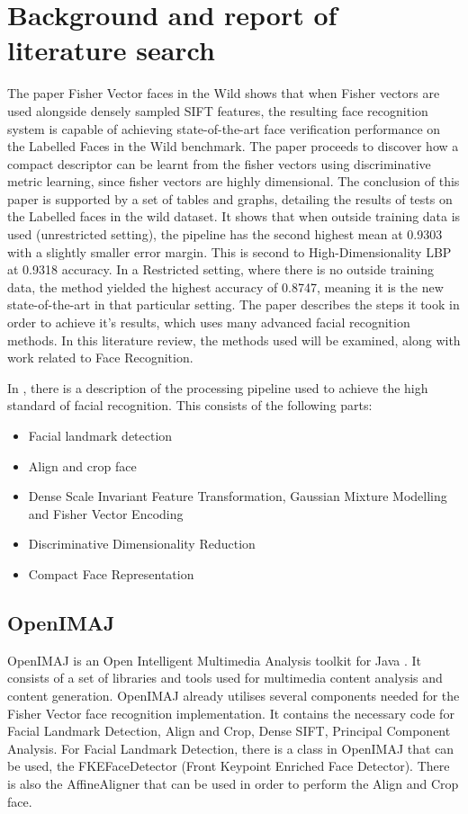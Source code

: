 \documentclass[12pt, a4paper]{article}
\begin{document}
\newpage
\section{Background and report of literature search}
The paper Fisher Vector faces in the Wild \cite{simonyan2004fisher} shows that when Fisher vectors are used alongside densely sampled SIFT features, the resulting face recognition system is capable of achieving state-of-the-art face verification performance on the Labelled Faces in the Wild \cite{labelledFaces} benchmark. The paper proceeds to discover how a compact descriptor can be learnt from the fisher vectors using discriminative metric learning, since fisher vectors are highly dimensional. The conclusion of this paper is supported by a set of tables and graphs, detailing the results of tests on the Labelled faces in the wild dataset. It shows that when outside training data is used (unrestricted setting), the pipeline has the second highest mean at 0.9303 with a slightly smaller error margin. This is second to High-Dimensionality LBP at 0.9318 accuracy. In a Restricted setting, where there is no outside training data, the method yielded the highest accuracy of 0.8747, meaning it is the new state-of-the-art in that particular setting. The paper describes the steps it took in order to achieve it’s results, which uses many advanced facial recognition methods. In this literature review, the methods used will be examined, along with work related to Face Recognition.

In \cite{simonyan2004fisher}, there is a description of the processing pipeline used to achieve the high standard of facial recognition. This consists of the following parts:
\begin{itemize}
\item Facial landmark detection
\item Align and crop face
\item Dense Scale Invariant Feature Transformation, Gaussian Mixture Modelling and Fisher Vector Encoding
\item Discriminative Dimensionality Reduction
\item Compact Face Representation

\end{itemize}
\subsection{OpenIMAJ}
OpenIMAJ is an Open Intelligent Multimedia Analysis toolkit for Java \cite{openimaj}. It consists of a set of libraries and tools used for multimedia content analysis and content generation. OpenIMAJ already utilises several components needed for the Fisher Vector face recognition implementation. It contains the necessary code for Facial Landmark Detection, Align and Crop,  Dense SIFT, Principal Component Analysis. 
For Facial Landmark Detection, there is a class in OpenIMAJ that can be used, the FKEFaceDetector (Front Keypoint Enriched Face Detector). There is also the AffineAligner that can be used in order to perform the Align and Crop face. 
\end{document}
